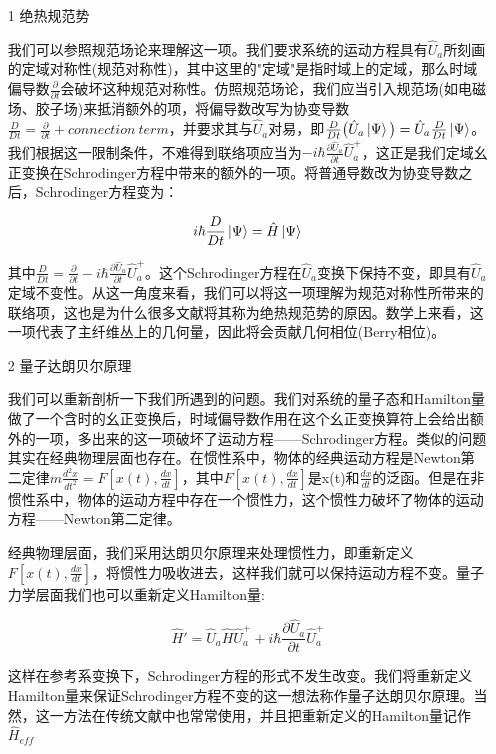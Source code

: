 \documentclass[a4paper]{article}
\begin{document}
        \begin{itemize}
        \item[1] 绝热规范势 
            
            我们可以参照规范场论来理解这一项。我们要求系统的运动方程具有$\hat{U}_a$所刻画的定域对称性(规范对称性)，其中这里的"定域"是指时域上的定域，那么时域偏导数$\frac{\partial}{\partial t}$会破坏这种规范对称性。仿照规范场论，我们应当引入规范场(如电磁场、胶子场)来抵消额外的项，将偏导数改写为协变导数$\frac{D}{Dt}=\frac{\partial}{\partial t}+connection\ term$，并要求其与$\hat{U}_a$对易，即$\frac{D}{Dt}\big(\hat{U}_a\ket{\Psi}\big)=\hat{U}_a\frac{D}{Dt}\ket{\Psi}$。我们根据这一限制条件，不难得到联络项应当为$-i\hbar\frac{\partial\hat{U}_a}{\partial t}\hat{U}_a^+$，这正是我们定域幺正变换在Schrodinger方程中带来的额外的一项。将普通导数改为协变导数之后，Schrodinger方程变为：

            \begin{equation}
                i\hbar\frac{D}{Dt}\ket{\Psi} = \hat{H}\ket{\Psi}
            \end{equation}

            其中$\frac{D}{Dt}=\frac{\partial}{\partial t}-i\hbar\frac{\partial\hat{U}_a}{\partial t}\hat{U}_a^+$。这个Schrodinger方程在$\hat{U}_a$变换下保持不变，即具有$\hat{U}_a$定域不变性。从这一角度来看，我们可以将这一项理解为规范对称性所带来的联络项，这也是为什么很多文献将其称为绝热规范势的原因。数学上来看，这一项代表了主纤维丛上的几何量，因此将会贡献几何相位(Berry相位)。
        
        \item[2] 量子达朗贝尔原理
            
            我们可以重新剖析一下我们所遇到的问题。我们对系统的量子态和Hamilton量做了一个含时的幺正变换后，时域偏导数作用在这个幺正变换算符上会给出额外的一项，多出来的这一项破坏了运动方程——Schrodinger方程。类似的问题其实在经典物理层面也存在。在惯性系中，物体的经典运动方程是Newton第二定律$m\frac{d^2x}{dt^2}=F[x(t),\frac{dx}{dt}]$，其中$F[x(t),\frac{dx}{dt}]$是x(t)和$\frac{dx}{dt}$的泛函。但是在非惯性系中，物体的运动方程中存在一个惯性力，这个惯性力破坏了物体的运动方程——Newton第二定律。

            经典物理层面，我们采用达朗贝尔原理来处理惯性力，即重新定义$F[x(t),\frac{dx}{dt}]$，将惯性力吸收进去，这样我们就可以保持运动方程不变。量子力学层面我们也可以重新定义Hamilton量:
            
            \begin{equation}
                \hat{H}'=\hat{U}_a\hat{H}\hat{U}_a^+ + i\hbar\frac{\partial\hat{U}_a}{\partial t}\hat{U}_a^+
            \end{equation}

            这样在参考系变换下，Schrodinger方程的形式不发生改变。我们将重新定义Hamilton量来保证Schrodinger方程不变的这一想法称作量子达朗贝尔原理。当然，这一方法在传统文献中也常常使用，并且把重新定义的Hamilton量记作$\hat{H}_{eff}$
            
        \end{itemize}
\end{document}
